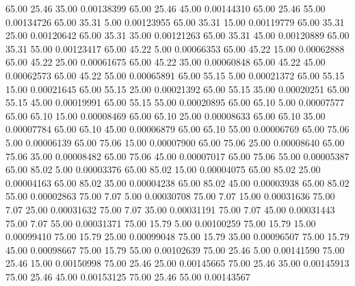      65.00     25.46     35.00     0.00138399
     65.00     25.46     45.00     0.00144310
     65.00     25.46     55.00     0.00134726
     65.00     35.31      5.00     0.00123955
     65.00     35.31     15.00     0.00119779
     65.00     35.31     25.00     0.00120642
     65.00     35.31     35.00     0.00121263
     65.00     35.31     45.00     0.00120889
     65.00     35.31     55.00     0.00123417
     65.00     45.22      5.00     0.00066353
     65.00     45.22     15.00     0.00062888
     65.00     45.22     25.00     0.00061675
     65.00     45.22     35.00     0.00060848
     65.00     45.22     45.00     0.00062573
     65.00     45.22     55.00     0.00065891
     65.00     55.15      5.00     0.00021372
     65.00     55.15     15.00     0.00021645
     65.00     55.15     25.00     0.00021392
     65.00     55.15     35.00     0.00020251
     65.00     55.15     45.00     0.00019991
     65.00     55.15     55.00     0.00020895
     65.00     65.10      5.00     0.00007577
     65.00     65.10     15.00     0.00008469
     65.00     65.10     25.00     0.00008633
     65.00     65.10     35.00     0.00007784
     65.00     65.10     45.00     0.00006879
     65.00     65.10     55.00     0.00006769
     65.00     75.06      5.00     0.00006139
     65.00     75.06     15.00     0.00007900
     65.00     75.06     25.00     0.00008640
     65.00     75.06     35.00     0.00008482
     65.00     75.06     45.00     0.00007017
     65.00     75.06     55.00     0.00005387
     65.00     85.02      5.00     0.00003376
     65.00     85.02     15.00     0.00004075
     65.00     85.02     25.00     0.00004163
     65.00     85.02     35.00     0.00004238
     65.00     85.02     45.00     0.00003938
     65.00     85.02     55.00     0.00002863
     75.00      7.07      5.00     0.00030708
     75.00      7.07     15.00     0.00031636
     75.00      7.07     25.00     0.00031632
     75.00      7.07     35.00     0.00031191
     75.00      7.07     45.00     0.00031443
     75.00      7.07     55.00     0.00031371
     75.00     15.79      5.00     0.00100259
     75.00     15.79     15.00     0.00099410
     75.00     15.79     25.00     0.00099048
     75.00     15.79     35.00     0.00096507
     75.00     15.79     45.00     0.00098667
     75.00     15.79     55.00     0.00102639
     75.00     25.46      5.00     0.00141590
     75.00     25.46     15.00     0.00150998
     75.00     25.46     25.00     0.00145665
     75.00     25.46     35.00     0.00145913
     75.00     25.46     45.00     0.00153125
     75.00     25.46     55.00     0.00143567
